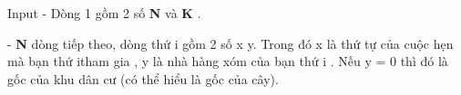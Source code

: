 Input
- Dòng 1 gồm 2 số \textbf{ N } và \textbf{ K } .

- \textbf{ N } dòng tiếp theo, dòng thứ i gồm 2 số x y. Trong đó x là thứ tự của cuộc hẹn mà bạn thứ itham gia , y là nhà hàng xóm của bạn thứ i . Nếu y = 0 thì đó là gốc của khu dân cư (có thể hiểu là gốc của cây).